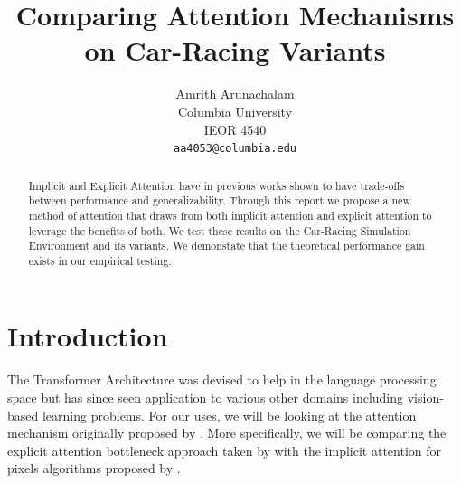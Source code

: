 \documentclass[10pt,twocolumn,letterpaper]{article}
\begin{document}
\title{Comparing Attention Mechanisms on Car-Racing Variants}

\author{Amrith Arunachalam\\
    Columbia University\\
    IEOR 4540\\
    {\tt\small aa4053@columbia.edu}
}
\maketitle

\begin{abstract}
    Implicit and Explicit Attention have in previous works shown to 
    have trade-offs between performance and generalizability. Through this
    report we propose a new method of attention that draws from both implicit
    attention and explicit attention to leverage the benefits of both. 
    We test these results on the Car-Racing Simulation Environment and 
    its variants. We demonstate that the theoretical performance gain exists in 
    our empirical testing.
  
\end{abstract}

\section{Introduction}

The Transformer Architecture was devised to help in the language processing space
but has since seen application to various other domains including vision-based learning problems. 
For our uses, we will be looking at the attention mechanism originally proposed by \cite{Vaswani}. 
More specifically, we will be comparing the explicit attention bottleneck approach taken 
by \cite{Tang} with the implicit attention for pixels algorithms proposed by \cite{choromanski}.
\end{document}
